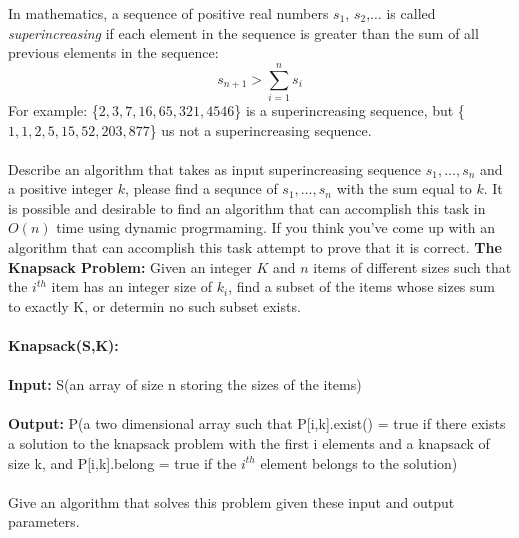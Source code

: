 \documentclass[12pt]{article}
\begin{document}
\newpage
\noindent In mathematics, a sequence of positive real numbers 
$s_1$, $s_2$,$\dots$ is called \textit{superincreasing} if each element
in the sequence is greater than the sum of all previous elements in the sequence:
$$s_{n+1} > \sum\limits_{i=1}^{n}s_i$$
For example: \{$2,3,7,16,65,321,4546$\} is a superincreasing sequence, 
but \{$1,1,2,5,15,52,203,877$\} us not a superincreasing sequence.\\\\
Describe an algorithm that takes as input superincreasing sequence $s_1,\dots,s_n$ and a positive 
integer $k$, please find a sequnce of $s_1,\dots,s_n$ with the sum equal
to $k$. It is possible and desirable to find an algorithm that can accomplish this
task in $O(n)$ time using dynamic progrmaming. If you think you've come up with an
algorithm that can accomplish this task attempt to prove that it is correct.
\newpage
\noindent \textbf{The Knapsack Problem: }Given an integer $K$ and $n$ items of different sizes such 
that the $i^{th}$ item has an integer size of $k_i$, find a subset of the items whose sizes sum 
to exactly K, or determin no such subset exists.\\\\
\textbf{Knapsack(S,K):}\\\\
\textbf{Input: }S(an array of size n storing the sizes of the items)\\\\
\textbf{Output: }P(a two dimensional array such that P[i,k].exist() = true if there 
exists a solution to the knapsack problem with the first i elements and a knapsack of size 
k, and P[i,k].belong = true if the $i^{th}$ element belongs to the solution)\\\\
Give an algorithm that solves this problem given these input and output parameters. 
\end{document}
